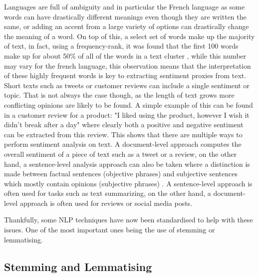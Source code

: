 Languages are full of ambiguity and in particular the French language as some words can have drastically different meanings even though they are written the same, or adding an accent from a large variety of options can drastically change the meaning of a word. On top of this, a select set of words make up the majority of text, in fact, using a frequency-rank, it was found that the first 100 words make up for about 50\% of all of the words in a text cluster \citep{ahmad2007being}, while this number may vary for the french language, this observation means that the interpretation of these highly frequent words is key to extracting sentiment proxies from text. Short texts such as tweets \citep{chandrasekaran2020topics} or customer reviews can include a single sentiment or topic. That is not always the case though, as the length of text grows more conflicting opinions are likely to be found. A simple example of this can be found in a customer review for a product: "I liked using the product, however I wish it didn't break after a day" where clearly both a positive and negative sentiment can be extracted from this review. This shows that there are multiple ways to perform sentiment analysis on text. A document-level approach computes the overall sentiment of a piece of text such as a tweet or a review, on the other hand, a sentence-level analysis approach can also be taken where a distinction is made between factual sentences (objective phrases) and subjective sentences which mostly contain opinions (subjective phrases) \citep{wilson2009recognizing}. A sentence-level approach is often used for tasks such as text summarizing, on the other hand, a document-level approach is often used for reviews or social media posts. 

Thankfully, some NLP techniques have now been standardised to help with these issues. One of the most important ones being the use of stemming or lemmatising.

\subsection{Stemming and Lemmatising}
\label{lemmatization}\label{stemming}

